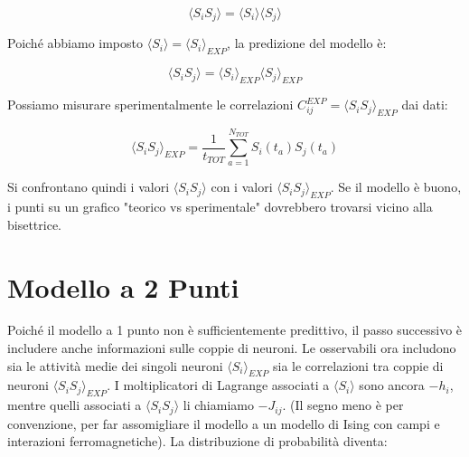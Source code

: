 \begin{equation} \label{eq:ch23_9}
\langle S_i S_j \rangle = \langle S_i \rangle \langle S_j \rangle
\end{equation}

Poiché abbiamo imposto $\langle S_i \rangle = \langle S_i \rangle_{EXP}$, la predizione del modello è:

\begin{equation} \label{eq:ch23_10}
\langle S_i S_j \rangle = \langle S_i \rangle_{EXP} \langle S_j \rangle_{EXP}
\end{equation}

Possiamo misurare sperimentalmente le correlazioni $C_{ij}^{EXP} = \langle S_i S_j \rangle_{EXP}$ dai dati:

\begin{equation} \label{eq:ch23_11}
\langle S_i S_j \rangle_{EXP} = \frac{1}{t_{TOT}} \sum_{a=1}^{N_{TOT}} S_i(t_a) S_j(t_a)
\end{equation}

Si confrontano quindi i valori $\langle S_i S_j \rangle$ con i valori $\langle S_i S_j \rangle_{EXP}$. Se il modello è buono, i punti su un grafico "teorico vs sperimentale" dovrebbero trovarsi vicino alla bisettrice.

\vspace{0.5cm}
\noindent{}
\vspace{0.5cm}


\section{Modello a 2 Punti}
Poiché il modello a 1 punto non è sufficientemente predittivo, il passo successivo è includere anche informazioni sulle coppie di neuroni.
Le osservabili ora includono sia le attività medie dei singoli neuroni $\langle S_i \rangle_{EXP}$ sia le correlazioni tra coppie di neuroni $\langle S_i S_j \rangle_{EXP}$. I moltiplicatori di Lagrange associati a $\langle S_i \rangle$ sono ancora $-h_i$, mentre quelli associati a $\langle S_i S_j \rangle$ li chiamiamo $-J_{ij}$. (Il segno meno è per convenzione, per far assomigliare il modello a un modello di Ising con campi e interazioni ferromagnetiche).
La distribuzione di probabilità diventa:

